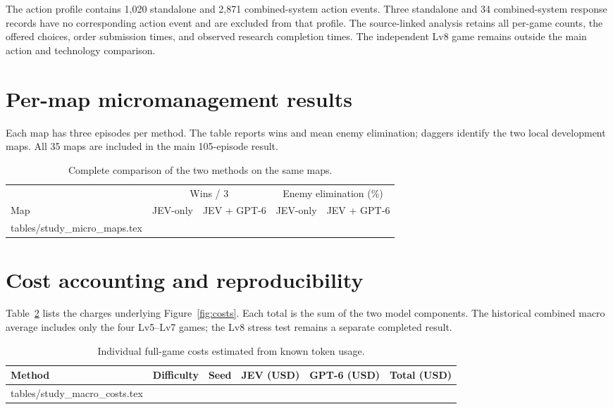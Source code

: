 \documentclass{article}
\makeatletter
\newcommand{\tablerows}[1]{\@@input #1 }
\newcommand{\captionbelowtable}{\normalsize\setlength{\abovecaptionskip}{7pt}\setlength{\belowcaptionskip}{0pt}}
\makeatother
\begin{document}
The action profile contains 1,020 standalone and 2,871 combined-system action events. Three standalone and 34 combined-system response records have no corresponding action event and are excluded from that profile. The source-linked analysis retains all per-game counts, the offered choices, order submission times, and observed research completion times. The independent Lv8 game remains outside the main action and technology comparison.

\clearpage
\section{Per-map micromanagement results}
\label{app:maps}

Each map has three episodes per method. The table reports wins and mean enemy elimination; daggers identify the two local development maps. All 35 maps are included in the main 105-episode result.

\begin{table}[H]
\centering\small
\begin{tabular}{lrrrr}
\toprule
& \multicolumn{2}{c}{Wins / 3} & \multicolumn{2}{c}{Enemy elimination (\%)} \\
\cmidrule(lr){2-3}\cmidrule(lr){4-5}
Map & JEV-only & JEV + GPT-6 & JEV-only & JEV + GPT-6 \\
\midrule

\tablerows{tables/study_micro_maps.tex}
\bottomrule
\end{tabular}
\captionbelowtable
\caption{Complete comparison of the two methods on the same maps.}
\label{tab:allmaps}
\end{table}

\clearpage
\section{Cost accounting and reproducibility}
\label{app:costs}

Table~\ref{tab:individualcosts} lists the charges underlying Figure~\ref{fig:costs}. Each total is the sum of the two model components. The historical combined macro average includes only the four Lv5--Lv7 games; the Lv8 stress test remains a separate completed result.

\begin{table}[h]
\centering\small
\begin{tabular}{llcrrr}
\toprule
Method & Difficulty & Seed & JEV (USD) & GPT-6 (USD) & Total (USD) \\
\midrule
\tablerows{tables/study_macro_costs.tex}
\bottomrule
\end{tabular}
\captionbelowtable
\caption{Individual full-game costs estimated from known token usage.}
\label{tab:individualcosts}
\end{table}
\end{document}
